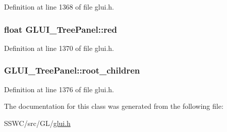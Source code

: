 Definition at line 1368 of file glui.\+h.

\hypertarget{class_g_l_u_i___tree_panel_a39d13ee9c5ffe021b141bca6c671bfd2}{
\subsubsection[{red}]{\setlength{\rightskip}{0pt plus 5cm}float G\+L\+U\+I\+\_\+\+Tree\+Panel\+::red}}\label{class_g_l_u_i___tree_panel_a39d13ee9c5ffe021b141bca6c671bfd2}


Definition at line 1370 of file glui.\+h.

\hypertarget{class_g_l_u_i___tree_panel_af8a2ba6a77b418ae7f1c77a13369ee80}{
\subsubsection[{root\+\_\+children}]{ G\+L\+U\+I\+\_\+\+Tree\+Panel\+::root\+\_\+children}}\label{class_g_l_u_i___tree_panel_af8a2ba6a77b418ae7f1c77a13369ee80}


Definition at line 1376 of file glui.\+h.



The documentation for this class was generated from the following file\+:\begin{DoxyCompactItemize}
\item 
S\+S\+W\+C/src/\+G\+L/\hyperlink{glui_8h}{glui.\+h}\end{DoxyCompactItemize}
